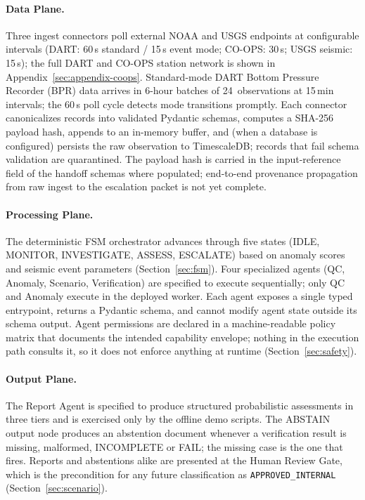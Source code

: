 \documentclass{article}
\begin{document}
\paragraph{Data Plane.}
Three ingest connectors poll external NOAA and USGS endpoints at
configurable intervals (DART: 60\,s standard / 15\,s event mode;
CO-OPS: 30\,s; USGS seismic: 15\,s);
the full DART and CO-OPS station network is shown in
Appendix~\ref{sec:appendix-coops}. Standard-mode DART
Bottom Pressure Recorder (BPR) data arrives in 6-hour batches of 24~observations at 15\,min
intervals; the 60\,s poll cycle detects mode transitions promptly. Each connector canonicalizes
records into validated Pydantic schemas, computes a SHA-256 payload
hash, appends to an in-memory buffer, and (when a database is configured)
persists the raw observation to TimescaleDB; records that fail schema
validation are quarantined. The payload hash is carried in the input-reference field of the
handoff schemas where populated; end-to-end
provenance propagation from raw ingest to the escalation packet is not yet
complete.

\paragraph{Processing Plane.}
The deterministic FSM orchestrator advances through five states
(IDLE, MONITOR, INVESTIGATE, ASSESS, ESCALATE) based on anomaly scores
and seismic event parameters (Section~\ref{sec:fsm}). Four specialized
agents (QC, Anomaly, Scenario, Verification) are specified to execute
sequentially; only QC and Anomaly execute in the deployed worker.
Each agent exposes a single typed entrypoint, returns a Pydantic
schema, and cannot modify agent state outside its schema output. Agent
permissions are declared in a machine-readable policy matrix that
documents the intended capability envelope; nothing in the execution
path consults it, so it does not enforce anything at runtime
(Section~\ref{sec:safety}).

\paragraph{Output Plane.}
The Report Agent is specified to produce structured probabilistic
assessments in three tiers and is exercised only by the offline demo
scripts. The ABSTAIN output node produces an abstention document
whenever a verification result is missing, malformed, INCOMPLETE or
FAIL; the missing case is the one that fires. Reports and abstentions alike are presented at
the Human Review Gate, which is the precondition for any future
classification as \texttt{APPROVED\_INTERNAL}
(Section~\ref{sec:scenario}).
\end{document}
